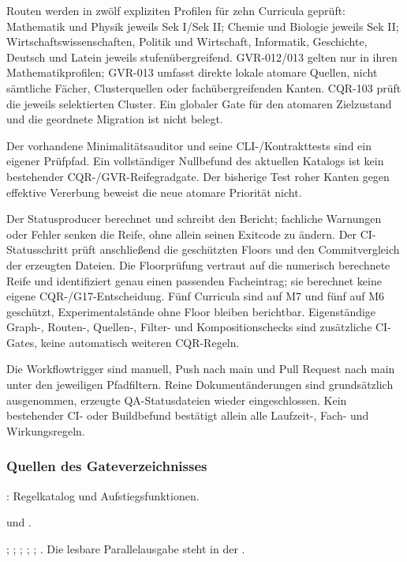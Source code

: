 Routen werden in zwölf expliziten Profilen für zehn Curricula geprüft: Mathematik und Physik jeweils Sek I/Sek II; Chemie und Biologie jeweils Sek II; Wirtschaftswissenschaften, Politik und Wirtschaft, Informatik, Geschichte, Deutsch und Latein jeweils stufenübergreifend. GVR-012/013 gelten nur in ihren Mathematikprofilen; GVR-013 umfasst direkte lokale atomare Quellen, nicht sämtliche Fächer, Clusterquellen oder fachübergreifenden Kanten. CQR-103 prüft die jeweils selektierten Cluster. Ein globaler Gate für den atomaren Zielzustand und die geordnete Migration ist nicht belegt.

Der vorhandene Minimalitätsauditor und seine CLI-/Kontrakttests sind ein eigener Prüfpfad. Ein vollständiger Nullbefund des aktuellen Katalogs ist kein bestehender CQR-/GVR-Reifegradgate. Der bisherige Test roher Kanten gegen effektive Vererbung beweist die neue atomare Priorität nicht.

Der Statusproducer berechnet und schreibt den Bericht; fachliche Warnungen oder Fehler senken die Reife, ohne allein seinen Exitcode zu ändern. Der CI-Statusschritt prüft anschließend die geschützten Floors und den Commitvergleich der erzeugten Dateien. Die Floorprüfung vertraut auf die numerisch berechnete Reife und identifiziert genau einen passenden Facheintrag; sie berechnet keine eigene CQR-/G17-Entscheidung. Fünf Curricula sind auf M7 und fünf auf M6 geschützt, Experimentalstände ohne Floor bleiben berichtbar. Eigenständige Graph-, Routen-, Quellen-, Filter- und Kompositionschecks sind zusätzliche CI-Gates, keine automatisch weiteren CQR-Regeln.

Die Workflowtrigger sind manuell, Push nach main und Pull Request nach main unter den jeweiligen Pfadfiltern. Reine Dokumentänderungen sind grundsätzlich ausgenommen, erzeugte QA-Statusdateien wieder eingeschlossen. Kein bestehender CI- oder Buildbefund bestätigt allein alle Laufzeit-, Fach- und Wirkungsregeln.

\subsubsection*{Quellen des Gateverzeichnisses}
: Regelkatalog und Aufstiegsfunktionen.\par
{} und .\par
{};
;
;
;
;
.
Die lesbare Parallelausgabe steht in der .

